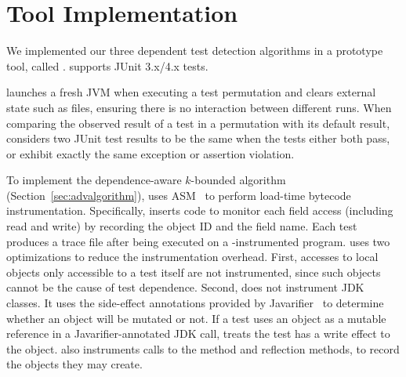 \section{Tool Implementation}
\label{sec:impl}


We implemented our three dependent test detection algorithms in
a prototype tool, called \ourtool. \ourtool
supports JUnit 3.x/4.x tests. %

\ourtool launches a fresh JVM when
executing a test permutation and clears external state such
as files, ensuring there is no interaction between
different runs. When comparing the observed result of
a test in a permutation with its default result,
\ourtool considers two JUnit test results to be the same when the
tests either both pass, or exhibit exactly the same exception
or assertion violation.

 

To implement the dependence-aware $k$-bounded algorithm (Section~\ref{sec:advalgorithm}),
\ourtool uses ASM~\cite{asm} to perform load-time bytecode
instrumentation. Specifically, \ourtool inserts code to monitor each
field access (including read and write) by recording the
object ID and the field name. Each test produces a trace file after being
executed on a \ourtool-instrumented program.
\ourtool uses two optimizations to reduce the
instrumentation overhead. First, accesses to local objects
only accessible to a test itself are not instrumented,
since such objects cannot
be the cause of test dependence. Second,
\ourtool does not instrument JDK classes. It uses the side-effect
annotations provided by Javarifier~\cite{QuinonezTE2008} to 
determine whether an object will be mutated or not.
If a test uses an object as a mutable reference
in a Javarifier-annotated JDK call, \ourtool treats the test
has a write effect to the object.
\ourtool also instruments
calls to the  method and reflection
methods, to record the objects they may create.


